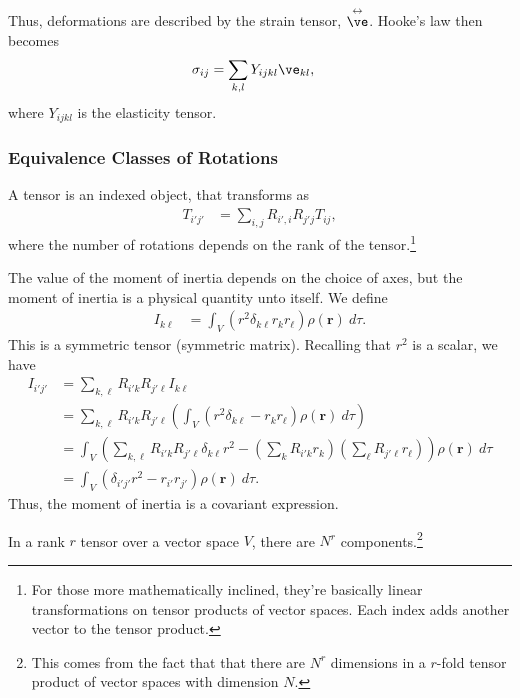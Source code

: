 \documentclass[10pt]{mypackage}
\newcommand{\doublevec}[1]{\overset{\scriptsize \leftrightarrow}{#1}}
\begin{document}
  Thus, deformations are described by the strain tensor, $\doublevec{\ve}$. Hooke's law then becomes
  \begin{align*}
    \sigma_{ij} &= \sum_{k,l}Y_{ijkl}\ve_{kl},
  \end{align*}
  where $Y_{ijkl}$ is the elasticity tensor.
  \subsubsection{Equivalence Classes of Rotations}%
  A tensor is an indexed object, that transforms as
  \begin{align*}
    T_{i'j'} &= \sum_{i,j}R_{i',i}R_{j' j}T_{ij},
  \end{align*}
  where the number of rotations depends on the rank of the tensor.\footnote{For those more mathematically inclined, they're basically linear transformations on tensor products of vector spaces. Each index adds another vector to the tensor product.}
  \begin{example}
    The value of the moment of inertia depends on the choice of axes, but the moment of inertia is a physical quantity unto itself. We define
    \begin{align*}
      I_{k\ell} &= \int_{V}^{} \left( r^2\delta_{k\ell}r_kr_{\ell} \right)\rho\left( \mathbf{r} \right)\:d\tau.
    \end{align*}
    This is a symmetric tensor (symmetric matrix). Recalling that $r^2$ is a scalar, we have
    \begin{align*}
      I_{i'j'} &= \sum_{k,\ell}R_{i' k}R_{j' \ell}I_{k\ell}\\
               &= \sum_{k,\ell}R_{i' k}R_{j' \ell} \left( \int_{V}^{} \left( r^2\delta_{k\ell}-r_kr_{\ell} \right)\rho\left( \mathbf{r} \right)\:d\tau \right)\\
               &= \int_{V}^{} \left( \sum_{k,\ell}R_{i' k}R_{j' \ell}\delta_{k\ell}r^2 - \left( \sum_{k}R_{i' k}r_k \right)\left( \sum_{\ell}R_{j' \ell}r_{\ell} \right) \right)\rho\left( \mathbf{r} \right)\:d\tau\\
               &= \int_{V}^{} \left( \delta_{i' j'}r^2 - r_{i'}r_{j'} \right)\rho\left( \mathbf{r} \right)\:d\tau.
    \end{align*}
    Thus, the moment of inertia is a covariant expression.
  \end{example}
  In a rank $r$ tensor over a vector space $V$, there are $N^{r}$ components.\footnote{This comes from the fact that that there are $N^{r}$ dimensions in a $r$-fold tensor product of vector spaces with dimension $N$.}\newline
\end{document}
